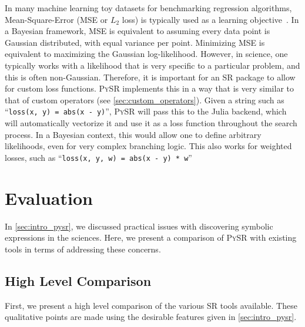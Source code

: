 \documentclass[letterpaper,twocolumn]{scrartcl}
\newcommand\we{we\xspace}
\newcommand\pysr{\textsc{PySR}\xspace}
\newcommand\sr{SR\xspace}
\begin{document}
In many machine learning toy datasets for benchmarking regression algorithms, Mean-Square-Error (MSE or $L_2$ loss) is typically used as a learning objective~\cite{grinsztajnWhyTreebasedModels2022}.
In a Bayesian framework, MSE is equivalent to assuming every data point is Gaussian distributed, with equal variance per point.
Minimizing MSE is equivalent to maximizing the Gaussian log-likelihood.
However, in science, one typically works with 
a likelihood that is very specific to a particular problem,
and this is often non-Gaussian.
Therefore, it is important for an \sr package to allow for custom loss functions.
\pysr implements this in a way that is very similar to that of custom operators (see \cref{sec:custom_operators}).
Given a string such as ``\texttt{loss(x, y) = abs(x - y)}'', \pysr will pass this to the Julia backend, which will automatically vectorize it and use it as a loss function throughout the search process.
In a Bayesian context, this would allow one to define arbitrary likelihoods, even for very complex branching logic.
This also works for weighted losses, such as ``\texttt{loss(x, y, w) = abs(x - y) * w}''


\section{Evaluation}
\label{sec:evaluation}



In \cref{sec:intro_pysr}, \we discussed practical issues with discovering symbolic expressions in the sciences.
Here, \we present a comparison of \pysr with existing tools in terms of addressing these concerns.


\subsection{High Level Comparison}

First, \we present a high level comparison of the various \sr tools available.
These qualitative points are made using the desirable features given in \cref{sec:intro_pysr}.


\newcommand\extranotes{
& Expressivity scores: (1a) Inflexible basis of fixed expressions, combined in a linear sum.
(1b) Pre-trained on equations generated from limited prior.
(2) Flexible basis of expressions, with variable internal coefficients.
(3) Any scalar tree, with binary and unary operators.
(4) Any scalar tree, with custom operators allowed.
(5) Any scalar tree, with n-ary operators.
(6) Scalar/vector/tensor expressions of any arity.
\\
$\ast$ & Note that the ``Symbolic Distillation'' method from~\cite{cranmerDiscoveringSymbolicModels2020} is not an algorithm itself; it can be applied to any SR technique. Applying this general method to a specific technique will inherit a {\color{green}$\checkmark$} from the Symbolic Distillation column, if given. However, in general, this technique is easiest with those methods which have deep learning export.\\
}
\end{document}
